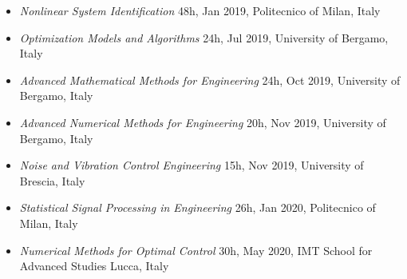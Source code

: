 \documentclass[10pt]{article}
\begin{document}
\begin{itemize}	
	\setlength\itemsep{-8pt}
	\renewcommand\labelitemi{$\vcenter{\hbox{\tiny$\bullet$}}$}
	\vspace{-4pt}

	\item \textit{Nonlinear System Identification} \hfill 48h, Jan 2019, Politecnico of Milan, Italy\\
	\vspace{-4pt}{\tiny Proff. L. Piroddi, S. Formentin, S. Garatti, G. Panzani and L. Fagiano}
	
	\item \textit{Optimization Models and Algorithms} \hfill 24h, Jul 2019, University of Bergamo, Italy\\
	\vspace{-4pt}{\tiny Prof. M. T. Vespucci}
	 
	\item \textit{Advanced Mathematical Methods for Engineering} \hfill 24h, Oct 2019, University of Bergamo, Italy\\
	\vspace{-4pt}{\tiny Proff. M. Pedroni and A. Raimondo}
	 
	\item \textit{Advanced Numerical Methods for Engineering} \hfill 20h, Nov 2019, University of Bergamo, Italy\\
	\vspace{-4pt}{\tiny Prof. C. Vergara}
	 

	\item \textit{Noise and Vibration Control Engineering} \hfill 15h, Nov 2019, University of Brescia, Italy\\
	\vspace{-4pt}{\tiny Prof. N. B. Roozen}
	
	\item \textit{Statistical Signal Processing in Engineering} \hfill 26h, Jan 2020, Politecnico of Milan, Italy\\
	\vspace{-4pt}{\tiny Prof. U. Spagnolini}
	 
	\item \textit{Numerical Methods for Optimal Control} \hfill 30h, May 2020, IMT School for Advanced Studies Lucca, Italy\\
	\vspace{-4pt}{\tiny Prof. M. Zanon}
	

\end{itemize}
\end{document}
